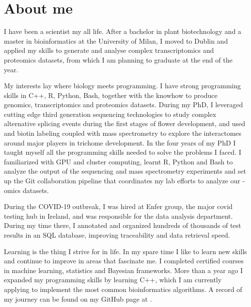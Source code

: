 \section{About me}
I have been a scientist my all life. After a bachelor in plant biotechnology
and a master in bioinformatics at the University of Milan, I moved to Dublin
and applied my skills to generate and analyse complex transcriptomics and
proteomics datasets, from which I am planning to graduate at the end of the
year.

My interests lay where biology meets programming. I have strong programming
skills in C++, R, Python, Bash, together with the knowhow to produce genomics,
transcriptomics and proteomics datasets. During my PhD, I leveraged cutting
edge third generation sequencing technologies to study complex alternative
splicing events during the first stages of flower development, and used and
biotin labeling coupled with mass spectrometry to explore the interactomes
around major players in trichome development. In the four years of my PhD I
taught myself all the programming skills needed to solve the problems I faced.
I familiarized with GPU and cluster computing, learnt R, Python and Bash to
analyze the output of the sequencing and mass spectrometry experiments and set
up the Git collaboration pipeline that coordinates my lab efforts to analyze
our -omics datasets.

During the COVID-19 outbreak, I was hired at Enfer group, the major covid
testing hub in Ireland, and was responsible for the data analysis department.
During my time there, I annotated and organized hundreds of thousands of test
results in an SQL database, improving traceability and data retrieval speed.

Learning is the thing I strive for in life. In my spare time I like to learn
new skills and continue to improve in areas that fascinate me. I completed
certified courses in machine learning, statistics and Bayesian frameworks.
More than a year ago I expanded my programming skills by learning C++, which I
am currently applying to implement the most common bioinformatics algorithms.
A record of my journey can be found on my GitHub page at
\textcolor{blue}{{}}.

